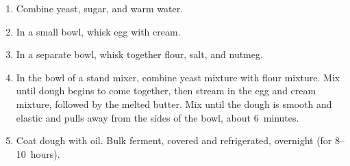 

\begin{ingredients}
\end{ingredients}

\begin{recipe}
  \begin{enumerate}

  \item Combine yeast, sugar, and warm water.

  \item In a small bowl, whisk egg with cream.

  \item In a separate bowl, whisk together flour, salt, and nutmeg.

  \item In the bowl of a stand mixer, combine yeast mixture with flour
    mixture.  Mix until dough begins to come together, then stream in
    the egg and cream mixture, followed by the melted butter.  Mix
    until the dough is smooth and elastic and pulls away from the
    sides of the bowl, about 6~minutes.

  \item Coat dough with oil.  Bulk ferment, covered and refrigerated,
    overnight (for 8--10~hours).

  \end{enumerate}
\end{recipe}



\begin{ingredients}
\end{ingredients}

